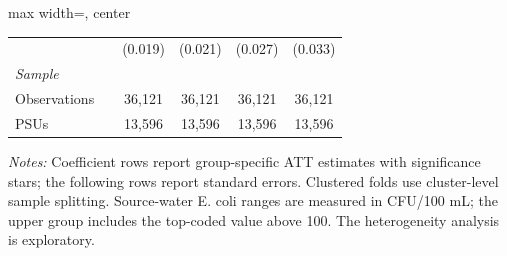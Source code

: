 \begin{landscape}
\begin{table}[p]
\begin{adjustbox}{max width=\linewidth, center}
\begin{tabular}{llcccc}
 &  & (0.019) & (0.021) & (0.027) & (0.033) \\
\multicolumn{6}{l}{\textit{Sample}} \\
\quad Observations &  & 36,121 & 36,121 & 36,121 & 36,121 \\
\quad PSUs &  & 13,596 & 13,596 & 13,596 & 13,596 \\
\bottomrule
\end{tabular}
\end{adjustbox}
\par\vspace{3pt}
\begin{minipage}{\linewidth}\footnotesize \textit{Notes:} Coefficient rows report group-specific ATT estimates with significance stars; the following rows report standard errors. Clustered folds use cluster-level sample splitting. Source-water E. coli ranges are measured in CFU/100 mL; the upper group includes the top-coded value above 100. The heterogeneity analysis is exploratory.\end{minipage}
\end{table}
\end{landscape}